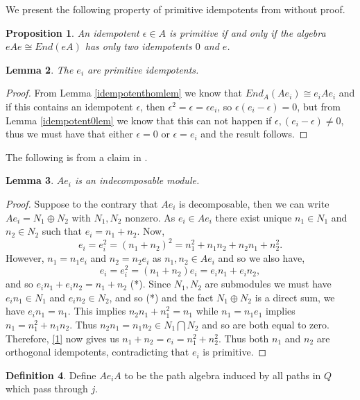 \documentclass[11.5pt, twoside, a4paper, titlepage]{report}
\theoremstyle{definition}
\newtheorem{mydef}{Definition}[section]
\theoremstyle{plain}
\newtheorem{lem}[mydef]{Lemma}
\newtheorem{prop}[mydef]{Proposition}
\begin{document}
We present the following property of primitive idempotents from \cite{Assem} without proof.
\begin{prop}
An idempotent $\epsilon \in A$ is primitive if and only if the algebra $eAe \cong End(eA)$ has only two idempotents $0$ and $e$.
\end{prop}

\begin{lem}
The $e_i$ are primitive idempotents.
\end{lem}
\begin{proof}
From Lemma \ref{idempotenthomlem} we know that $End_A(Ae_i) \cong e_iAe_i$ and if this contains an idempotent $\epsilon$, then $\epsilon^2=\epsilon=\epsilon e_i$, so $\epsilon(e_i- \epsilon)=0$, but from Lemma \ref{idempotent0lem} we know that this can not happen if $\epsilon, (e_i-\epsilon) \neq 0$, thus we must have that either $\epsilon=0$ or $\epsilon=e_i$ and the result follows.
\end{proof}

The following is from a claim in \cite{Vale}.
\begin{lem}
$Ae_i$ is an indecomposable module.
\end{lem}
\begin{proof}
Suppose to the contrary that $Ae_i$ is decomposable, then we can write $Ae_i=N_1\oplus N_2$ with $N_1,N_2$ nonzero. As $e_i \in Ae_i$ there exist unique $n_1\in N_1$ and $n_2\in N_2$ such that $e_i=n_1+n_2$. Now,
\begin{equation} \label{1}
e_i=e_i^2=(n_1+n_2)^2=n_1^2+ n_1n_2 +n_2n_1+n_2^2.
\end{equation}
However, $n_1=n_1e_i$ and $n_2=n_2e_i$ as $n_1,n_2\in Ae_i$ and so we also have,
\begin{equation*}
e_i=e_i^2=(n_1+n_2)e_i=e_in_1+e_in_2,
\end{equation*}
and so $e_in_1+e_in_2=n_1+n_2$ (*). Since $N_1, N_2$ are submodules we must have $e_in_1\in N_1$ and $e_in_2\in N_2$, and so (*) and  the fact $N_1\oplus N_2$ is a direct sum, we have $e_in_1=n_1$. This implies $n_2n_1+n_1^2=n_1$ while $n_1=n_1e_1$ implies $n_1=n_1^2+n_1n_2$. Thus $n_2n_1=n_1n_2 \in N_1 \bigcap N_2$ and so are both equal to zero. Therefore, \ref{1} now gives us $n_1+n_2=e_i=n_1^2+n_2^2$. Thus both $n_1$ and $n_2$ are orthogonal idempotents, contradicting that $e_i$ is primitive. 
\end{proof}

\begin{mydef}
Define $Ae_iA$ to be the path algebra induced by all paths in $Q$ which pass through $j$. 
\end{mydef}
\end{document}
